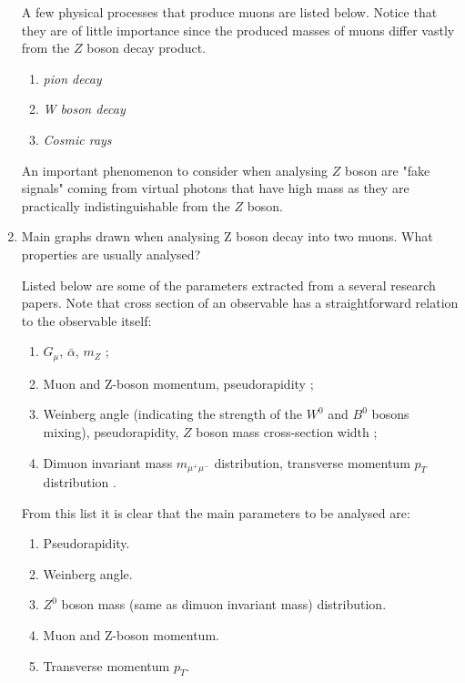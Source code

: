 \documentclass[11pt,a4paper,twoside]{article}
\begin{document}
\begin{enumerate}
        A few physical processes that produce muons are listed below. Notice that they are of little importance since the produced masses of muons differ vastly from the $Z$ boson decay product.

        \begin{enumerate}
            \item \textit{pion decay}
            \item \textit{W boson decay}
            \item \textit{Cosmic rays}
        \end{enumerate}


        An important phenomenon to consider when analysing $Z$ boson are "fake signals" coming from virtual photons that have high mass as they are practically indistinguishable from the $Z$ boson.

        
        \item Main graphs drawn when analysing Z boson decay into two muons. What properties are usually analysed?

        Listed below are some of the parameters extracted from a several research papers. Note that cross section of an observable has a straightforward relation to the observable itself:
        \begin{enumerate}
            \item $G_{\mu}$, $\bar{\alpha}$, $m_Z$ \cite{novikov1999theory};
            \item Muon and Z-boson momentum, pseudorapidity \cite{khodaverdian2019accuracy};
            \item Weinberg angle (indicating the strength of the $W^0$ and $B^0$ bosons mixing), pseudorapidity, $Z$ boson mass cross-section width \cite{ATLAS_Z_lab};
            \item Dimuon invariant mass $m_{\mu^{+} \mu^{-}}$ distribution, transverse momentum $p_T$ distribution \cite{Bursche:2014ltl}.
        \end{enumerate}

        From this list it is clear that the main parameters to be analysed are:
        \begin{enumerate}
            \item Pseudorapidity.
            \item Weinberg angle.
            \item $Z^0$ boson mass (same as dimuon invariant mass) distribution.
            \item Muon and Z-boson momentum.
            \item Transverse momentum $p_T$.
        \end{enumerate}



\end{enumerate}
\end{document}
